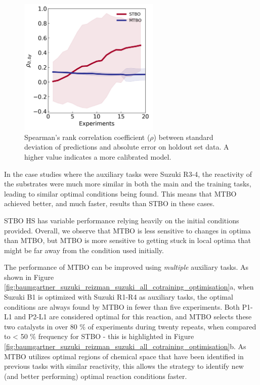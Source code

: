\begin{figure}
    \centering
    \includegraphics[width=0.6\textwidth]{gfx/Chapter04/baumgartner_suzuki_reizman_suzuki_case_2_optimization_uncertainty.png}
    \caption{Spearman's rank correlation coefficient ($\rho$) between standard deviation of predictions and absolute error on holdout set data. A higher value indicates a more calibrated model.}
    \label{fig:uncertainty_multitask}
\end{figure}


In the case studies where the auxiliary tasks were Suzuki R3-4, the reactivity of the substrates were much more similar in both the main and the training tasks, leading to similar optimal conditions being found. This means that MTBO achieved better, and much faster, results than STBO in these cases. 

STBO HS has variable performance relying heavily on the initial conditions provided. Overall, we observe that MTBO is less sensitive to changes in optima than MTBO, but MTBO is more sensitive to getting stuck in local optima that might be far away from the condition used initially. 

The performance of MTBO can be improved using \textit{multiple} auxiliary tasks. As shown in Figure \ref{fig:baumgartner_suzuki_reizman_suzuki_all_cotraining_optimisation}a, when Suzuki B1 is optimized with Suzuki R1-R4 as auxiliary tasks, the optimal conditions are always found by MTBO in fewer than five experiments. Both P1-L1 and P2-L1 are considered optimal for this reaction, and MTBO selects these two catalysts in over 80 \% of experiments during twenty repeats, when compared to \textless{} 50 \% frequency for STBO - this is highlighted in Figure \ref{fig:baumgartner_suzuki_reizman_suzuki_all_cotraining_optimisation}b. As MTBO utilizes optimal regions of chemical space that have been identified in previous tasks with similar reactivity, this allows the strategy to identify new (and better performing) optimal reaction conditions faster.

